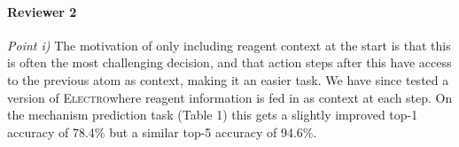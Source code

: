 \documentclass{article}
\newcommand{\ourModel}{\textsc{Electro}}
\begin{document}
% 




\paragraph{Reviewer 2}
\emph{Point i)}
The motivation of only including reagent context at the start is that this is often the most challenging decision, and that action steps after this have access to the previous atom as context, making it an easier task.
We have since tested a version of \ourModel where reagent information is fed in as context at each step. 
On the mechanism prediction task (Table 1) this gets a slightly improved top-1 accuracy of 78.4\% but a similar top-5 accuracy of 94.6\%.
\end{document}
